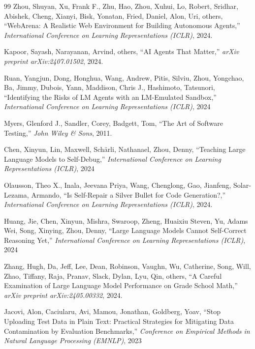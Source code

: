 \documentclass[letterpaper, 10 pt, conference]{ieeeconf}
\begin{document}
\begin{thebibliography}{99}
Zhou, Shuyan, Xu, Frank F., Zhu, Hao, Zhou, Xuhui, Lo, Robert, Sridhar, Abishek, Cheng, Xianyi, Bisk, Yonatan, Fried, Daniel, Alon, Uri, others, ``{WebArena}: A Realistic Web Environment for Building Autonomous Agents,'' \emph{International Conference on Learning Representations (ICLR)}, 2024.

Kapoor, Sayash, Narayanan, Arvind, others, ``{AI} Agents That Matter,'' \emph{arXiv preprint arXiv:2407.01502}, 2024.

Ruan, Yangjun, Dong, Honghua, Wang, Andrew, Pitis, Silviu, Zhou, Yongchao, Ba, Jimmy, Dubois, Yann, Maddison, Chris J., Hashimoto, Tatsunori, ``Identifying the Risks of {LM} Agents with an {LM}-Emulated Sandbox,'' \emph{International Conference on Learning Representations (ICLR)}, {2024}

Myers, Glenford J., Sandler, Corey, Badgett, Tom, ``The Art of Software Testing,'' \emph{John Wiley \& Sons}, 2011.

Chen, Xinyun, Lin, Maxwell, Sch{\"a}rli, Nathanael, Zhou, Denny, ``Teaching Large Language Models to Self-Debug,'' \emph{International Conference on Learning Representations (ICLR)}, {2024}

Olausson, Theo X., Inala, Jeevana Priya, Wang, Chenglong, Gao, Jianfeng, Solar-Lezama, Armando, ``Is Self-Repair a Silver Bullet for Code Generation?,'' \emph{International Conference on Learning Representations (ICLR)}, 2024.

Huang, Jie, Chen, Xinyun, Mishra, Swaroop, Zheng, Huaixiu Steven, Yu, Adams Wei, Song, Xinying, Zhou, Denny, ``Large Language Models Cannot Self-Correct Reasoning Yet,'' \emph{International Conference on Learning Representations (ICLR)}, {2024}

Zhang, Hugh, Da, Jeff, Lee, Dean, Robinson, Vaughn, Wu, Catherine, Song, Will, Zhao, Tiffany, Raja, Pranav, Slack, Dylan, Lyu, Qin, others, ``A Careful Examination of Large Language Model Performance on Grade School Math,'' \emph{arXiv preprint arXiv:2405.00332}, 2024.

Jacovi, Alon, Caciularu, Avi, Mamou, Jonathan, Goldberg, Yoav, ``Stop Uploading Test Data in Plain Text: Practical Strategies for Mitigating Data Contamination by Evaluation Benchmarks,'' \emph{Conference on Empirical Methods in Natural Language Processing (EMNLP)}, {2023}


\end{thebibliography}
\end{document}

